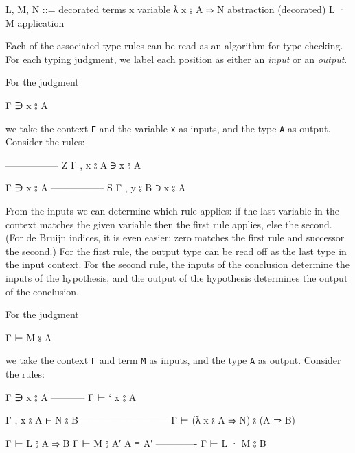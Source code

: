 \begin{myDisplay}
L, M, N ::=                         decorated terms
  x                                   variable
  ƛ x ⦂ A ⇒ N                         abstraction (decorated)
  L · M                               application
\end{myDisplay}

Each of the associated type rules can be read as an algorithm for type
checking. For each typing judgment, we label each position as either an
\emph{input} or an \emph{output}.

For the judgment

\begin{myDisplay}
Γ ∋ x ⦂ A
\end{myDisplay}

we take the context \texttt{Γ} and the variable \texttt{x} as inputs,
and the type \texttt{A} as output. Consider the rules:

\begin{myDisplay}
----------------- Z
Γ , x ⦂ A ∋ x ⦂ A

Γ ∋ x ⦂ A
----------------- S
Γ , y ⦂ B ∋ x ⦂ A
\end{myDisplay}

From the inputs we can determine which rule applies: if the last
variable in the context matches the given variable then the first rule
applies, else the second. (For de Bruijn indices, it is even easier:
zero matches the first rule and successor the second.) For the first
rule, the output type can be read off as the last type in the input
context. For the second rule, the inputs of the conclusion determine the
inputs of the hypothesis, and the output of the hypothesis determines
the output of the conclusion.

For the judgment

\begin{myDisplay}
Γ ⊢ M ⦂ A
\end{myDisplay}

we take the context \texttt{Γ} and term \texttt{M} as inputs, and the
type \texttt{A} as output. Consider the rules:

\begin{myDisplay}
Γ ∋ x ⦂ A
-----------
Γ ⊢ ` x ⦂ A

Γ , x ⦂ A ⊢ N ⦂ B
---------------------------
Γ ⊢ (ƛ x ⦂ A ⇒ N) ⦂ (A ⇒ B)

Γ ⊢ L ⦂ A ⇒ B
Γ ⊢ M ⦂ A′
A ≡ A′
-------------
Γ ⊢ L · M ⦂ B
\end{myDisplay}

